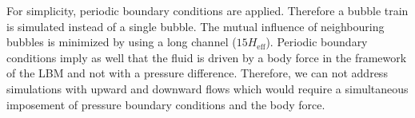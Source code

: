 \documentclass[preprint,12pt]{elsarticle}
\begin{document}
For simplicity, periodic boundary conditions are applied. Therefore  a bubble
train is simulated
instead of a single bubble.  The mutual influence of neighbouring bubbles is minimized
by using a long
channel ($15 H_{\mathrm{eff}}$). Periodic boundary conditions imply as well that the fluid is driven
by a
body force in the framework of the LBM and not with a pressure difference. Therefore, we can not
address simulations with upward and downward flows \cite{cerro-bubble-train} which would require a
simultaneous imposement of pressure boundary conditions and the body force. 
\end{document}
